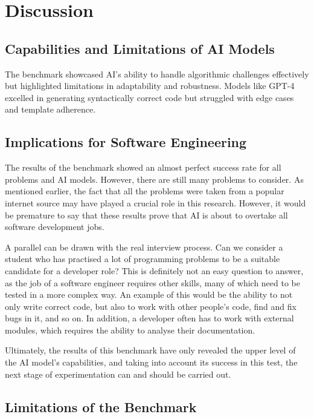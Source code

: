 
\section{Discussion}



\subsection{Capabilities and Limitations of AI Models}

The benchmark showcased AI’s ability to handle algorithmic challenges effectively but highlighted limitations in adaptability and robustness. Models like GPT-4 excelled in generating syntactically correct code but struggled with edge cases and template adherence.


\subsection{Implications for Software Engineering}

The results of the benchmark showed an almost perfect success rate for all problems and AI models. However, there are still many problems to consider. As mentioned earlier, the fact that all the problems were taken from a popular internet source may have played a crucial role in this research. However, it would be premature to say that these results prove that AI is about to overtake all software development jobs. 

A parallel can be drawn with the real interview process. Can we consider a student who has practised a lot of programming problems to be a suitable candidate for a developer role? This is definitely not an easy question to answer, as the job of a software engineer requires other skills, many of which need to be tested in a more complex way. An example of this would be the ability to not only write correct code, but also to work with other people's code, find and fix bugs in it, and so on. In addition, a developer often has to work with external modules, which requires the ability to analyse their documentation.

Ultimately, the results of this benchmark have only revealed the upper level of the AI model's capabilities, and taking into account its success in this test, the next stage of experimentation can and should be carried out.

\subsection{Limitations of the Benchmark}

